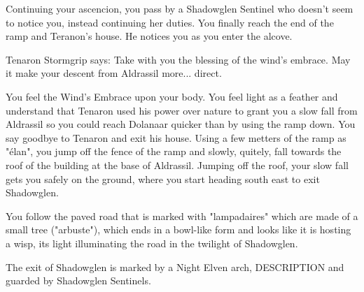 
Continuing your ascencion, you pass by a Shadowglen Sentinel who doesn't seem to notice you, instead continuing her duties. You finally reach the end of the ramp and Teranon's house. He notices you as you enter the alcove.





Tenaron Stormgrip says: Take with you the blessing of the wind's embrace. May it make your descent from Aldrassil more... direct.

You feel the Wind's Embrace upon your body. You feel light as a feather and understand that Tenaron used his power over nature to grant you a slow fall from Aldrassil so you could reach Dolanaar quicker than by using the ramp down. You say goodbye to Tenaron and exit his house. Using a few metters of the ramp as "élan", you jump off the fence of the ramp and slowly, quitely, fall towards the roof of the building at the base of Aldrassil. %
Jumping off the roof, your slow fall gets you safely on the ground, where you start heading south east to exit Shadowglen. %

You follow the paved road that is marked with "lampadaires" which are made of a small tree ("arbuste"), which ends in a bowl-like form and looks like it is hosting a wisp, its light illuminating the road in the twilight of Shadowglen.

The exit of Shadowglen is marked by a Night Elven arch, DESCRIPTION and guarded by Shadowglen Sentinels.

